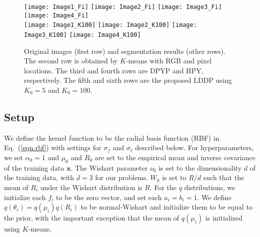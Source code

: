 \documentclass[runningheads,a4paper]{iscide}
\newcommand{\bs}[1]{\boldsymbol{#1}}
\begin{document}
\begin{figure}[!hp]
\begin{center}
 \texttt{[image: Image1\_Fi]}
 \texttt{[image: Image2\_Fi]}
 \texttt{[image: Image3\_Fi]}
 \texttt{[image: Image4\_Fi]}\\
  \texttt{[image: Image1\_K100]}
  \texttt{[image: Image2\_K100]}
  \texttt{[image: Image3\_K100]}
  \texttt{[image: Image4\_K100]}
\end{center}
\caption[]{Original images (first row) and segmentation results (other rows). The second row is obtained
  by $K$-means with RGB and pixel locations.
 The third and fourth rows are DPYP and HPY, respectively.
 The fifth and sixth rows are the proposed LDDP using $K_0=5$ and $K_0 = 100$.}
\label{fig4Images}
\end{figure}



\subsection{Setup}
We define the kernel function to be the radial basis function (RBF) in Eq.\ (\ref{eqn.rbf}) with settings for $\sigma_f$ and $\sigma_{\ell}$ described below.
For hyperparameters, we set $\alpha_0 = 1$ and ${\mu}_0$ and ${R}_0$ are set to the empirical mean and inverse covariance of the training data $\bs{x}$. The Wishart parameter $\nu_0$ is set to the dimensionality $d$
of the training data, with $d=3$ for our problems. ${W}_0$ is set to ${R}/d$ such that
the mean of ${R}_i$ under the Wishart distribution is ${R}$. For the $q$ distributions, we initialize each $f_i$ to be the zero vector, and set each $a_i = b_i = 1$. We define $q(\theta_i) = q(\mu_i)q(R_i)$ to be normal-Wishart and initialize them to be equal to the prior, with the important exception that the mean of $q(\mu_i)$ is initialized using $K$-means.
\end{document}
